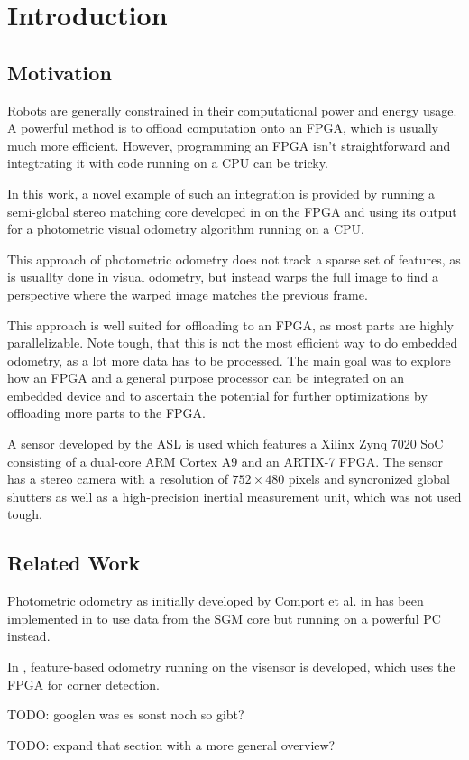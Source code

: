 \chapter{Introduction}
\label{sec:introduction}

\section{Motivation}
\label{sec:motivation}

Robots are generally constrained in their computational power and energy usage.
A powerful method is to offload computation onto an FPGA, which is usually
much more efficient.  However, programming an FPGA isn't straightforward and
integtrating it with code running on a CPU can be tricky.

In this work, a novel example of such an integration is provided by running a
semi-global stereo matching \cite{hirschmuller2005sgm} core developed in
\cite{honegger2014sgmcore} on the FPGA and using its output for a photometric
visual odometry algorithm running on a CPU.

This approach of photometric odometry does not track a sparse set of features,
as is usuallty done in visual odometry, but instead warps the full image to
find a perspective where the warped image matches the previous frame.

This approach is well suited for offloading to an FPGA, as most parts are
highly parallelizable. Note tough, that this is not the most efficient way to do embedded odometry,
as a lot more data has to be processed. The main goal was to explore how an
FPGA and a general purpose processor can be integrated on an embedded device
and to ascertain the potential for further optimizations by offloading more
parts to the FPGA.

A sensor developed by the ASL \cite{nikolic2014synchronized} is used
which features a Xilinx Zynq 7020 SoC consisting of a dual-core ARM Cortex A9
and an ARTIX-7 FPGA.  The sensor has a stereo camera with a resolution of $752
\times 480$ pixels and syncronized global shutters as well as a high-precision
inertial measurement unit, which was not used tough.



\section{Related Work}
\label{sec:related_work}

Photometric odometry as initially developed by Comport et al. in
\cite{comport2007odometry} has been implemented in \cite{omaridenseodometry} to
use data from the SGM core but running on a powerful PC instead.

In \cite{marcin2014odometry}, feature-based odometry running on the visensor is
developed, which uses the FPGA for corner detection.



TODO: googlen was es sonst noch so gibt?

TODO: expand that section with a more general overview?
